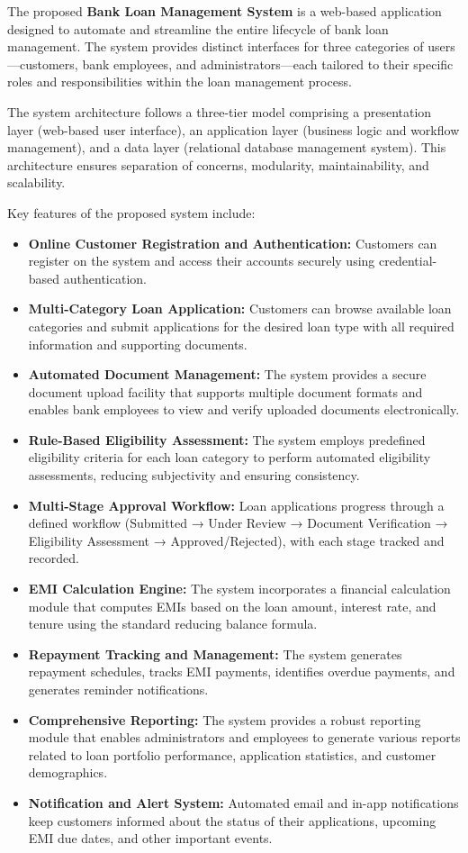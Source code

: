 The proposed \textbf{Bank Loan Management System} is a web-based application designed to automate and streamline the entire lifecycle of bank loan management. The system provides distinct interfaces for three categories of users—customers, bank employees, and administrators—each tailored to their specific roles and responsibilities within the loan management process.

The system architecture follows a three-tier model comprising a presentation layer (web-based user interface), an application layer (business logic and workflow management), and a data layer (relational database management system). This architecture ensures separation of concerns, modularity, maintainability, and scalability.

Key features of the proposed system include:

\begin{itemize}
  \item \textbf{Online Customer Registration and Authentication:} Customers can register on the system and access their accounts securely using credential-based authentication.
  \item \textbf{Multi-Category Loan Application:} Customers can browse available loan categories and submit applications for the desired loan type with all required information and supporting documents.
  \item \textbf{Automated Document Management:} The system provides a secure document upload facility that supports multiple document formats and enables bank employees to view and verify uploaded documents electronically.
  \item \textbf{Rule-Based Eligibility Assessment:} The system employs predefined eligibility criteria for each loan category to perform automated eligibility assessments, reducing subjectivity and ensuring consistency.
  \item \textbf{Multi-Stage Approval Workflow:} Loan applications progress through a defined workflow (Submitted → Under Review → Document Verification → Eligibility Assessment → Approved/Rejected), with each stage tracked and recorded.
  \item \textbf{EMI Calculation Engine:} The system incorporates a financial calculation module that computes EMIs based on the loan amount, interest rate, and tenure using the standard reducing balance formula.
  \item \textbf{Repayment Tracking and Management:} The system generates repayment schedules, tracks EMI payments, identifies overdue payments, and generates reminder notifications.
  \item \textbf{Comprehensive Reporting:} The system provides a robust reporting module that enables administrators and employees to generate various reports related to loan portfolio performance, application statistics, and customer demographics.
  \item \textbf{Notification and Alert System:} Automated email and in-app notifications keep customers informed about the status of their applications, upcoming EMI due dates, and other important events.
\end{itemize}

